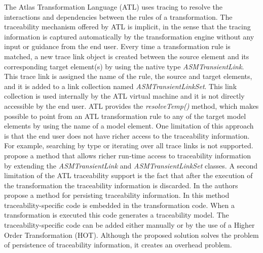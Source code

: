 \documentclass[runningheads,a4paper]{llncs}
\begin{document}
The Atlas Transformation Language (ATL) \cite{jouault2006transforming} uses
tracing to resolve the interactions and dependencies between the rules of a
transformation. The traceability mechanism offered by ATL is implicit, in the
sense that the tracing information is captured automatically by the
transformation engine without any input or guidance from the end user.  Every
time a transformation rule is matched, a new trace link object is created
between the source element and its corresponding target element(s) by using the
native type \emph{ASMTransientLink}. This trace link is assigned the name of the
rule, the source and target elements, and it is added to a link collection named
\emph{ASMTransientLinkSet}. This link collection is used internally by the ATL
virtual machine and it is not directly accessible by the end user. ATL provides
the \emph{resolveTemp()} method, which makes possible to point from an ATL
transformation rule to any of the target model elements by using the name of a
model element. One limitation of this approach is that the end user does not
have richer access to the traceability information. For example, searching by
type or iterating over all trace links is not supported. \cite{yie2009advanced}
propose a method that allows richer run-time access to traceability information
by extending the \emph{ASMTransientLink} and \emph{ASMTransientLinkSet} classes.
A second limitation of the ATL traceability support is the fact that after the
execution of the transformation the traceability information is discarded. In
\cite{jouault2005loosely} the authors propose a method for persisting
traceability information. In this method traceability-specific code is embedded
in the transformation code. When a transformation is executed this code
generates a traceability model. The traceability-specific code can be added
either manually or by the use of a Higher Order Transformation (HOT).  Although
the proposed solution solves the problem of persistence of traceability
information, it creates an overhead problem.
\end{document}
